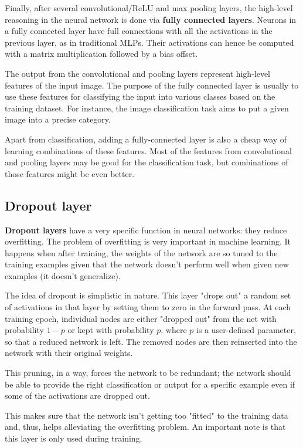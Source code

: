 Finally, after several convolutional/\ac{ReLU} and max pooling layers, the high-level reasoning in the neural network is done via \textbf{fully connected layers}. Neurons in a fully connected layer have full connections with all the activations in the previous layer, as in traditional \acsp{MLP}. Their activations can hence be computed with a matrix multiplication followed by a bias offset.

The output from the convolutional and pooling layers represent high-level features of the input image. The purpose of the fully connected layer is usually to use these features for classifying the input into various classes based on the training dataset. For instance, the image classification task aims to put a given image into a precise category.

Apart from classification, adding a fully-connected layer is also a cheap way of learning combinations of these features. Most of the features from convolutional and pooling layers may be good for the classification task, but combinations of those features might be even better.

\subsection{Dropout layer}

\textbf{Dropout layers} have a very specific function in neural networks: they reduce overfitting. The problem of overfitting is very important in machine learning. It happens when after training, the weights of the network are so tuned to the training examples given that the network doesn't perform well when given new examples (\ie it doesn't generalize).

The idea of dropout is simplistic in nature. This layer "drops out" a random set of activations in that layer by setting them to zero in the forward pass. At each training epoch, individual nodes are either "dropped out" from the net with probability $1-p$ or kept with probability $p$, where $p$ is a user-defined parameter, so that a reduced network is left. The removed nodes are then reinserted into the network with their original weights.

This pruning, in a way, forces the network to be redundant; the network should be able to provide the right classification or output for a specific example even if some of the activations are dropped out.

This makes sure that the network isn’t getting too "fitted" to the training data and, thus, helps alleviating the overfitting problem. An important note is that this layer is only used during training.

